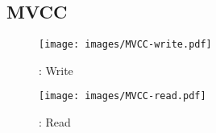 \begin{comment}
{\bf One-sided} In the {\em fetch} stage, read and write operation will all read the write timestamp and the record using RDMA \texttt{READ} in \step \textbf{b1}. In the {\em commit} stage, for write operations, which is shown in \step \textbf{b2} in Figure~\ref{fig:occ-write}, RDMA CAS will be used to lock the tuple on the remote node. A CAS failure will lead to an abort. After locking all \red{tuples} involved in write operations, the coordinators will use two RDMA \texttt{WRITES} to update and unlock the \red{tuple}. For read operations, which is illustrated in \step \textbf{b2} in Figure~\ref{fig:occ-read}, one RDMA \texttt{READ} is posted to read the current write timestamp of the remote tuple. If any timestamp has changed, the transaction will abort.

\end{comment}

\subsection{MVCC}

\begin{figure}[t]
    \begin{minipage}{.49\linewidth}
    \centering
    \texttt{[image: images/MVCC-write.pdf]}
    \vspace{-10mm}
    \caption{\mvcc: Write}
    \label{fig:mvcc-write}
    \end{minipage}
    \begin{minipage}{.49\linewidth}
    \centering
    \texttt{[image: images/MVCC-read.pdf]}
    \vspace{-10mm}
    \caption{\mvcc: Read}
    \label{fig:mvcc-read}
    \end{minipage}
    \vspace{-8mm}
\end{figure}

\begin{comment}
\begin{figure}[htp]
    \centering
    \vspace{-0.7cm}
    \texttt{[image: images/MVCC-write.pdf]}
    \vspace{-0.3cm}
    \caption{\mvcc: Write}
    \vspace{-0.4cm}
    \label{fig:mvcc-write}
\end{figure}

\begin{figure}[htp]
    \centering
    \vspace{-0.2cm}
    \texttt{[image: images/MVCC-read.pdf]}
    \vspace{-0.5cm}
    \caption{\mvcc: Read}
    \vspace{-0.3cm}
    \label{fig:mvcc-read}
\end{figure}
\end{comment}

